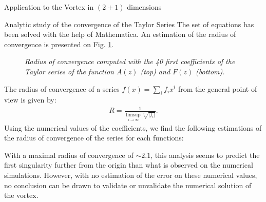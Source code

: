\begin{section}{Application to the Vortex in $(2+1)$ dimensions}
\begin{subsection}{Analytic study of the convergence of the Taylor Series}
    The set of equations has been solved with the help of
    Mathematica. An estimation of the radius of convergence is
    presented on Fig. \ref{fig:coeff}.
    \begin{figure}[ht!]
      \begin{center}
        
        
        \caption{\em Radius of convergence computed with the 40 first
          coefficients of the Taylor series of the function $A(z)$
          (top) and $F(z)$ (bottom).}
        \label{fig:coeff}        
      \end{center}
    \end{figure}
    The radius of convergence of a series $f(x) = \sum_i f_ix^i$ from
    the general point of view is given by:
    \begin{align}
      R = \frac{1}{\limsup_{i\to\infty}\sqrt[i]{|f_i|}}.
    \end{align}
    Using the numerical values of the coefficients, we find the
    following estimations of the radius of convergence of the series
    for each functions:
    \vspace{18pt}
    {
      \center
      \hfill{}\hfill
      \vspace{18pt}
    }

    With a maximal radius of convergence of $\sim 2.1$, this analysis
    seems to predict the first singularity further from the origin
    than what is observed on the numerical simulations.  However, with
    no estimation of the error on these numerical values, no
    conclusion can be drawn to validate or unvalidate the numerical
    solution of the vortex.
  \end{subsection}
\end{section}

